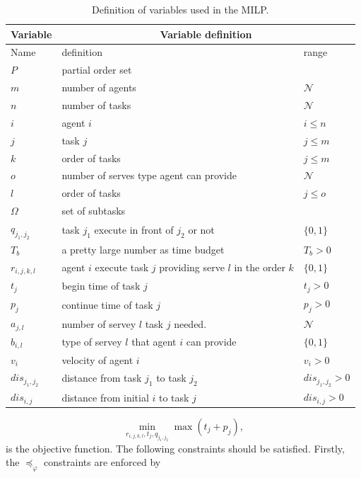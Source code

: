 \begin{table}[t]
	\begin{tabular}{|l|p{}|p{}|}\hline
		Variable &\multicolumn{2}{c|}{ Variable definition }\\\hline
		Name & definition & range \\
		$P$ & partial order set& \\
		$m$  & number of agents & $\mathcal{N}$\\
		$n$ & number of tasks & $\mathcal{N}$ \\
		$i$ & agent $i$ & $i\leq n$\\
		$j$ & task $j$ & $j\leq m$	\\
		$k$ & order of tasks & $j\leq m$\\
		$o$ & number of serves type agent can provide & $ \mathcal{N}$\\
		$l$ & order of tasks & $j\leq o$\\
		$\Omega$ & set of subtasks &\\
		$q_{j_1,j_2}$ &task $j_1$ execute in front of $j_2$ or not& $\{0,1\}$\\
		$T_b$ & a pretty large number as time budget & $T_b>0$ \\
		$r_{i,j,k,l}$ & agent $i$ execute task $j$ providing serve $l$ in the order $k$ & $\{0,1\}$\\
		$t_j$ & begin time of task $j$ & $t_j>0$ \\
		$p_j$ & continue time of task $j$ & $p_j >0$\\
		$a_{j,l}$ & number of servey $l$ task $j$ needed. & $\mathcal{N}$\\
		$b_{i,l}$ & type of servey $l$ that agent $i$ can provide & $\{0,1\}$ \\
		$v_i$ & velocity of agent $i$ &   $v_i>0$\\
		$dis_{j_1,j_2}$ & distance from task $j_1$ to task $j_2$ &  $dis_{j_1,j_2}>0$\\
		$dis_{i,j}$ & distance from initial $i$ to task $j$ & $dis_{i,j}>0$\\\hline
	\end{tabular}
	\centering
	\caption{Definition of variables used in the MILP.}
	\label{tab:variables}
\end{table}
\begin{equation}
\min_{r_{i,j,k,l}, t_j,q_{j_1,j_2}}  \max(t_j+p_j),
\label{0}
\end{equation}
is the objective function.
The following constraints should be satisfied.
Firstly, the $\preceq_{\varphi}$ constraints are enforced by
